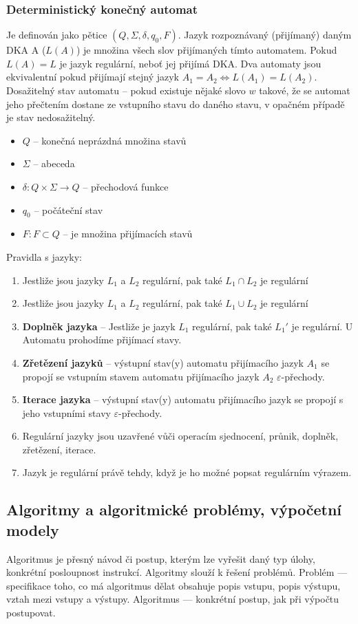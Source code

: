 \subsubsection{Deterministický konečný automat}
Je definován jako pětice $(Q, \Sigma, \delta, q_0, F)$. Jazyk rozpoznávaný (přijímaný) daným DKA A ($L(A)$) je množina všech slov přijímaných tímto automatem. Pokud $L(A) = L$ je jazyk regulární, neboť jej přijímá DKA. Dva automaty jsou ekvivalentní pokud přijímají stejný jazyk 
$A_1=A_2 \iff L(A_1)=L(A_2)$. Dosažitelný stav automatu -- pokud existuje nějaké slovo $w$ takové, že se automat jeho přečtením dostane ze vstupního stavu do daného stavu, v opačném případě je stav nedosažitelný.
\begin{itemize}
\item $Q$ -- konečná neprázdná množina stavů
\item $\Sigma$ -- abeceda
\item $\delta : Q \times \Sigma \rightarrow Q$ -- přechodová funkce
\item $q_0$ -- počáteční stav
\item $F: F \subset Q$ -- je množina přijímacích stavů
\end{itemize} 


Pravidla s jazyky:
\begin{enumerate}
\item Jestliže jsou jazyky $L_1$ a $L_2$ regulární, pak také $L_1 \cap L_2$ je regulární
\item Jestliže jsou jazyky $L_1$ a $L_2$ regulární, pak také $L_1 \cup L_2$ je regulární
\item \textbf{Doplněk jazyka} -- Jestliže je jazyk $L_1$ regulární, pak také $L_1'$ je regulární. U Automatu prohodíme přijímací stavy.
\item \textbf{Zřetězení jazyků} -- výstupní stav(y) automatu přijímacího jazyk $A_1$ se propojí se vstupním stavem automatu přijímacího jazyk $A_2$
$\varepsilon$-přechody.
\item \textbf{Iterace jazyka} -- výstupní stav(y) automatu přijímacího jazyk se propojí s jeho vstupními stavy $\varepsilon$-přechody.
\item Regulární jazyky jsou uzavřené vůči operacím sjednocení, průnik, doplněk, zřetězení, iterace.
\item Jazyk je regulární právě tehdy, když je ho možné popsat regulárním výrazem.
\end{enumerate}
\subsection{Algoritmy a algoritmické problémy, výpočetní modely}
Algoritmus je přesný návod či postup, kterým lze vyřešit daný typ úlohy, konkrétní posloupnost instrukcí.
Algoritmy slouží k řešení problémů. Problém — specifikace toho, co má algoritmus dělat obsahuje popis vstupu, popis výstupu, vztah mezi vstupy a výstupy. Algoritmus — konkrétní postup, jak při výpočtu postupovat.


